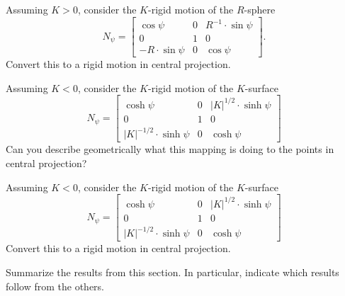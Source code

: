 \documentclass{ximera}
\begin{document}
\begin{problem}
  Assuming $K > 0$, consider the $K$-rigid motion of the $R$-sphere
  \[
  N_\psi=
  \begin{bmatrix}
    \cos\psi & 0 & R^{-1}\cdot\sin\psi\\
    0 & 1 & 0\\
    -R\cdot\sin\psi & 0 & \cos\psi
  \end{bmatrix}.
  \]
  Convert this to a rigid motion in central projection.
\end{problem}


\begin{problem}
  Assuming $K < 0$, consider the $K$-rigid motion of the $K$-surface
  \[
  N_\psi=
  \begin{bmatrix}
    \cosh\psi & 0 & |K|^{1/2}\cdot\sinh\psi\\
    0 & 1 & 0\\
    |K|^{-1/2}\cdot\sinh\psi & 0 & \cosh\psi
  \end{bmatrix}
  \]
  Can you describe geometrically what this mapping is doing to the
  points in central projection?
\end{problem}

  
\begin{problem}
  Assuming $K < 0$, consider the $K$-rigid motion of the $K$-surface
  \[
  N_\psi=
  \begin{bmatrix}
    \cosh\psi & 0 & |K|^{1/2}\cdot\sinh\psi\\
    0 & 1 & 0\\
    |K|^{-1/2}\cdot\sinh\psi & 0 & \cosh\psi
  \end{bmatrix}
  \]
  Convert this to a rigid motion in central projection.
\end{problem}


\begin{problem}
Summarize the results from this section. In particular, indicate which
results follow from the others.
\begin{freeResponse}
\end{freeResponse}
\end{problem}
\end{document}
